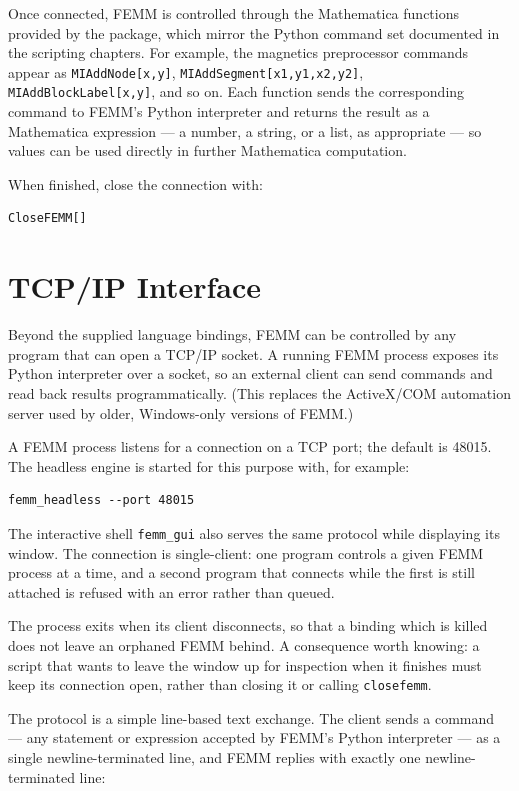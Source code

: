 Once connected, FEMM is controlled through the Mathematica functions provided by
the package, which mirror the Python command set documented in the scripting
chapters.  For example, the magnetics preprocessor commands appear as
\verb+MIAddNode[x,y]+, \verb+MIAddSegment[x1,y1,x2,y2]+,
\verb+MIAddBlockLabel[x,y]+, and so on.  Each function sends the corresponding
command to FEMM's Python interpreter and returns the result as a Mathematica
expression --- a number, a string, or a list, as appropriate --- so values can
be used directly in further Mathematica computation.

When finished, close the connection with:

\begin{verbatim}
CloseFEMM[]
\end{verbatim}

\chapter{TCP/IP Interface}

Beyond the supplied language bindings, FEMM can be controlled by any program
that can open a TCP/IP socket.  A running FEMM process exposes its Python
interpreter over a socket, so an external client can send commands and read back
results programmatically.  (This replaces the ActiveX/COM automation server used
by older, Windows-only versions of FEMM.)

A FEMM process listens for a connection on a TCP port; the default is 48015.
The headless engine is started for this purpose with, for example:

\begin{verbatim}
femm_headless --port 48015
\end{verbatim}

The interactive shell {\tt femm\_gui} also serves the same protocol while
displaying its window.  The connection is single-client: one program controls a
given FEMM process at a time, and a second program that connects while the
first is still attached is refused with an error rather than queued.

The process exits when its client disconnects, so that a binding which is
killed does not leave an orphaned FEMM behind.  A consequence worth knowing:
a script that wants to leave the window up for inspection when it finishes
must keep its connection open, rather than closing it or calling
{\tt closefemm}.

The protocol is a simple line-based text exchange.  The client sends a command
--- any statement or expression accepted by FEMM's Python interpreter --- as a
single newline-terminated line, and FEMM replies with exactly one
newline-terminated line:


